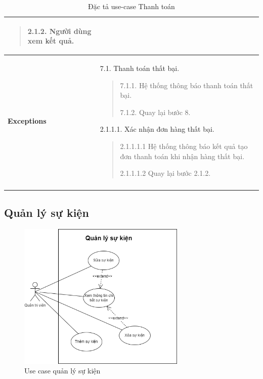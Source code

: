 {\begin{longtable}{| p{} | p{} |}
\begin{quote}
            2.1.2. Người dùng xem kết quả.
        \end{quote}
        \\
        \hline
        \begin{flushleft}
            \textbf{Exceptions}
        \end{flushleft}
         &
        7.1. Thanh toán thất bại.
        \begin{quote}
            7.1.1. Hệ thống thông báo thanh toán thất bại.

            7.1.2. Quay lại bước 8.
        \end{quote}
        2.1.1.1. Xác nhận đơn hàng thất bại.
        \begin{quote}
            2.1.1.1.1 Hệ thống thông báo kết quả tạo đơn thanh toán khi nhận hàng thất bại.

            2.1.1.1.2 Quay lại bước 2.1.2.
        \end{quote}
        \\
        \hline
        \caption{Đặc tả use-case Thanh toán}
    \end{longtable}
}


\subsection{Quản lý sự kiện}
\begin{figure}[!htp]
    \centering
    \includegraphics[width=8cm]{img/UseCase/UseCase-Quản lý sự kiện.drawio.png}
    \newline
    \caption{Use case quản lý sự kiện}
\end{figure}
